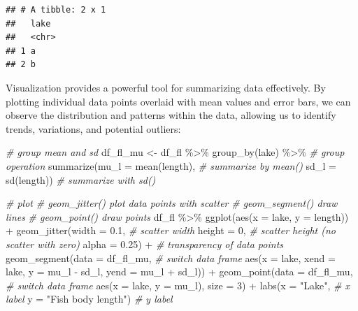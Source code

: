\documentclass[
]{book}
\newenvironment{Shaded}{\begin{snugshade}}{\end{snugshade}}
\newcommand{\AttributeTok}[1]{\textcolor[rgb]{0.77,0.63,0.00}{#1}}
\newcommand{\CommentTok}[1]{\textcolor[rgb]{0.56,0.35,0.01}{\textit{#1}}}
\newcommand{\DecValTok}[1]{\textcolor[rgb]{0.00,0.00,0.81}{#1}}
\newcommand{\FloatTok}[1]{\textcolor[rgb]{0.00,0.00,0.81}{#1}}
\newcommand{\FunctionTok}[1]{\textcolor[rgb]{0.00,0.00,0.00}{#1}}
\newcommand{\NormalTok}[1]{#1}
\newcommand{\OtherTok}[1]{\textcolor[rgb]{0.56,0.35,0.01}{#1}}
\newcommand{\SpecialCharTok}[1]{\textcolor[rgb]{0.00,0.00,0.00}{#1}}
\newcommand{\StringTok}[1]{\textcolor[rgb]{0.31,0.60,0.02}{#1}}
\begin{document}
\begin{verbatim}
## # A tibble: 2 x 1
##   lake 
##   <chr>
## 1 a    
## 2 b
\end{verbatim}

Visualization provides a powerful tool for summarizing data effectively. By plotting individual data points overlaid with mean values and error bars, we can observe the distribution and patterns within the data, allowing us to identify trends, variations, and potential outliers:

\begin{Shaded}
\begin{Highlighting}[]
\CommentTok{\# group mean and sd}
\NormalTok{df\_fl\_mu }\OtherTok{\textless{}{-}}\NormalTok{ df\_fl }\SpecialCharTok{\%\textgreater{}\%} 
  \FunctionTok{group\_by}\NormalTok{(lake) }\SpecialCharTok{\%\textgreater{}\%} \CommentTok{\# group operation}
  \FunctionTok{summarize}\NormalTok{(}\AttributeTok{mu\_l =} \FunctionTok{mean}\NormalTok{(length), }\CommentTok{\# summarize by mean()}
            \AttributeTok{sd\_l =} \FunctionTok{sd}\NormalTok{(length)) }\CommentTok{\# summarize with sd()}

\CommentTok{\# plot}
\CommentTok{\# geom\_jitter() plot data points with scatter}
\CommentTok{\# geom\_segment() draw lines}
\CommentTok{\# geom\_point() draw points}
\NormalTok{df\_fl }\SpecialCharTok{\%\textgreater{}\%} 
  \FunctionTok{ggplot}\NormalTok{(}\FunctionTok{aes}\NormalTok{(}\AttributeTok{x =}\NormalTok{ lake,}
             \AttributeTok{y =}\NormalTok{ length)) }\SpecialCharTok{+}
  \FunctionTok{geom\_jitter}\NormalTok{(}\AttributeTok{width =} \FloatTok{0.1}\NormalTok{, }\CommentTok{\# scatter width}
              \AttributeTok{height =} \DecValTok{0}\NormalTok{, }\CommentTok{\# scatter height (no scatter with zero)}
              \AttributeTok{alpha =} \FloatTok{0.25}\NormalTok{) }\SpecialCharTok{+} \CommentTok{\# transparency of data points}
  \FunctionTok{geom\_segment}\NormalTok{(}\AttributeTok{data =}\NormalTok{ df\_fl\_mu, }\CommentTok{\# switch data frame}
               \FunctionTok{aes}\NormalTok{(}\AttributeTok{x =}\NormalTok{ lake,}
                   \AttributeTok{xend =}\NormalTok{ lake,}
                   \AttributeTok{y =}\NormalTok{ mu\_l }\SpecialCharTok{{-}}\NormalTok{ sd\_l,}
                   \AttributeTok{yend =}\NormalTok{ mu\_l }\SpecialCharTok{+}\NormalTok{ sd\_l)) }\SpecialCharTok{+}
  \FunctionTok{geom\_point}\NormalTok{(}\AttributeTok{data =}\NormalTok{ df\_fl\_mu, }\CommentTok{\# switch data frame}
             \FunctionTok{aes}\NormalTok{(}\AttributeTok{x =}\NormalTok{ lake,}
                 \AttributeTok{y =}\NormalTok{ mu\_l),}
             \AttributeTok{size =} \DecValTok{3}\NormalTok{) }\SpecialCharTok{+}
  \FunctionTok{labs}\NormalTok{(}\AttributeTok{x =} \StringTok{"Lake"}\NormalTok{, }\CommentTok{\# x label}
       \AttributeTok{y =} \StringTok{"Fish body length"}\NormalTok{) }\CommentTok{\# y label}
\end{Highlighting}
\end{Shaded}
\end{document}
